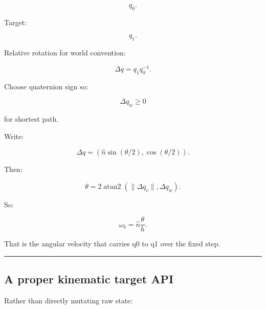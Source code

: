 \[
q_0.
\]

Target:

\[
q_1.
\]

Relative rotation for world convention:

\[
\Delta q
=
q_1q_0^{-1}.
\]

Choose quaternion sign so:

\[
\Delta q_w\ge0
\]

for shortest path.

Write:

\[
\Delta q
=
(
\hat n\sin(\theta/2),
\cos(\theta/2)
).
\]

Then:

\[
\theta
=
2\operatorname{atan2}
(
\|\Delta q_v\|,
\Delta q_w
).
\]

So:

\[
\boxed{
\omega_k
=
\hat n
\frac{\theta}{h}.
}
\]

That is the angular velocity that carries q0 to q1 over the fixed step.

\begin{center}\rule{0.5\linewidth}{0.5pt}\end{center}

\subsection{A proper kinematic target API}\label{06-engine-ii-ch037-a-proper-kinematic-target-api}

Rather than directly mutating raw state:

